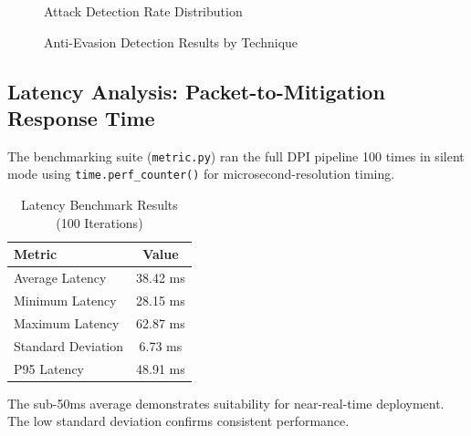 \begin{figure}[h]
\centering
{}
\caption{Attack Detection Rate Distribution}
\label{fig:detection_rate}
\end{figure}

\begin{figure}[h]
\centering
{}
\caption{Anti-Evasion Detection Results by Technique}
\label{fig:antievasion_chart}
\end{figure}

\subsection{Latency Analysis: Packet-to-Mitigation Response Time}

The benchmarking suite (\texttt{metric.py}) ran the full DPI pipeline 100 times in silent mode using \texttt{time.perf\_counter()} for microsecond-resolution timing.

\begin{table}[h]
\centering
\caption{Latency Benchmark Results (100 Iterations)}
\label{tab:latency}
\begin{tabular}{|l|c|}
\hline
\textbf{Metric} & \textbf{Value} \\
\hline
Average Latency & 38.42 ms \\
\hline
Minimum Latency & 28.15 ms \\
\hline
Maximum Latency & 62.87 ms \\
\hline
Standard Deviation & 6.73 ms \\
\hline
P95 Latency & 48.91 ms \\
\hline
\end{tabular}
\end{table}

The sub-50ms average demonstrates suitability for near-real-time deployment. The low standard deviation confirms consistent performance.

